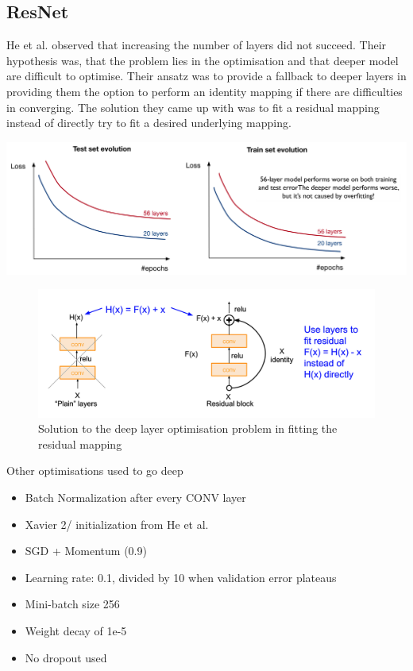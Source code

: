 \documentclass[11pt]{article}
\begin{document}
\subsection{ResNet}
He et al. observed that increasing the number of layers did not succeed. Their hypothesis was, that the problem lies in the optimisation and that deeper model are difficult to optimise. Their ansatz was to provide a fallback to deeper layers in providing them the option to perform an identity mapping if there are difficulties in converging. The solution they came up with was to fit a residual mapping instead of directly try to fit a desired underlying mapping.

\begin{center}
	\includegraphics[width=0.6\linewidth]{img/heetal_observation}
\end{center}

\begin{figure}[tbh]
	\centering
	\includegraphics[width=0.8\linewidth]{img/residual_mapping}
	\caption{Solution to the deep layer optimisation problem in fitting the residual mapping}
	\label{fig:residualmapping}
\end{figure}

Other optimisations used to go deep
\begin{itemize}
	\item Batch Normalization after every CONV layer
	\item Xavier 2/ initialization from He et al.
	\item SGD + Momentum (0.9)
	\item Learning rate: 0.1, divided by 10 when validation error plateaus
	\item Mini-batch size 256
	\item Weight decay of 1e-5
	\item No dropout used
\end{itemize}
\end{document}
